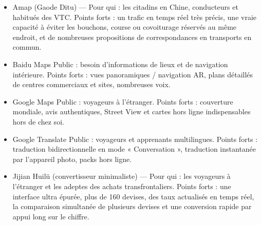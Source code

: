 \begin{itemize}
  \item Amap (Gaode Ditu) — Pour qui : les citadins en Chine, conducteurs et habitués des VTC. Points forts : un trafic en temps réel très précis, une vraie capacité à éviter les bouchons, course ou covoiturage réservés au même endroit, et de nombreuses propositions de correspondances en transports en commun.
  \item Baidu Maps Public : besoin d'informations de lieux et de navigation intérieure. Points forts : vues panoramiques / navigation AR, plans détaillés de centres commerciaux et sites, nombreuses voix.
  \item Google Maps Public : voyageurs à l'étranger. Points forts : couverture mondiale, avis authentiques, Street View et cartes hors ligne indispensables hors de chez soi.
\end{itemize}


\begin{itemize}
  \item Google Translate Public : voyageurs et apprenants multilingues. Points forts : traduction bidirectionnelle en mode « Conversation », traduction instantanée par l'appareil photo, packs hors ligne.
\end{itemize}


\begin{itemize}
  \item Jijian Huilü (convertisseur minimaliste) — Pour qui : les voyageurs à l'étranger et les adeptes des achats transfrontaliers. Points forts : une interface ultra épurée, plus de 160 devises, des taux actualisés en temps réel, la comparaison simultanée de plusieurs devises et une conversion rapide par appui long sur le chiffre.
\end{itemize}


